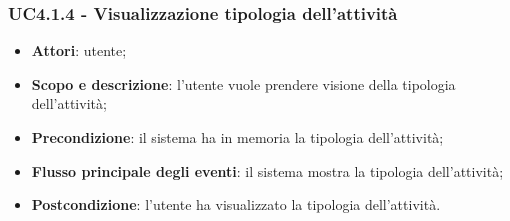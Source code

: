 \subsubsection{UC4.1.4 - Visualizzazione tipologia dell’attività }
\begin{itemize}
	\item \textbf{Attori}: utente;
	\item \textbf{Scopo e descrizione}: l’utente vuole prendere visione della tipologia dell’attività;
	\item \textbf{Precondizione}: il sistema ha in memoria la tipologia dell’attività;
	\item \textbf{Flusso principale degli eventi}: il sistema mostra la tipologia dell’attività;
	\item \textbf{Postcondizione}: l’utente ha visualizzato la tipologia dell’attività.
\end{itemize}


